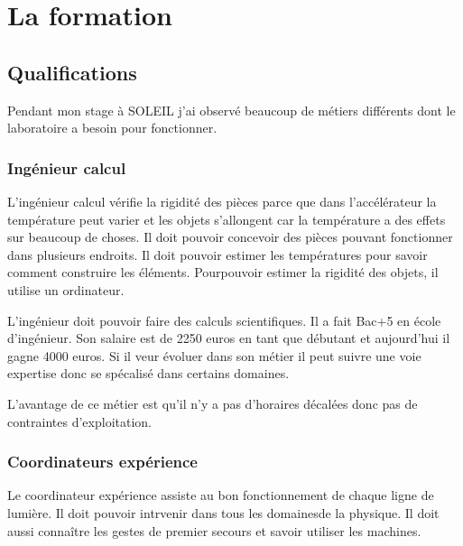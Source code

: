 
\chapter{La formation}
	\minitoc
	




			
	\section{Qualifications}

		Pendant mon stage à SOLEIL j'ai observé beaucoup de métiers différents dont le laboratoire a besoin pour fonctionner.			

		\subsection{Ingénieur calcul}
			L'ingénieur calcul vérifie la rigidité des pièces parce que dans l'accélérateur la température peut varier et les objets s'allongent car la température a des effets sur beaucoup de choses. Il doit pouvoir concevoir des pièces pouvant fonctionner dans plusieurs endroits. Il doit pouvoir estimer les températures pour savoir comment construire les éléments. Pourpouvoir estimer la rigidité des objets, il utilise un ordinateur.
			
			L'ingénieur doit pouvoir faire des calculs scientifiques. Il a fait Bac+5 en école d'ingénieur. Son salaire est de 2250 euros en tant que débutant et aujourd'hui il gagne 4000 euros. Si il veur évoluer dans son métier il peut suivre une voie expertise donc se spécalisé dans certains domaines.
			
			L'avantage de ce métier est qu'il n'y a pas d'horaires décalées donc pas de contraintes d'exploitation.  
		
		\subsection{Coordinateurs expérience}
			Le coordinateur expérience assiste au bon fonctionnement de chaque ligne de lumière. Il doit pouvoir intrvenir dans tous les domainesde la physique. Il doit aussi connaître les gestes de premier secours et savoir utiliser les machines.
			
